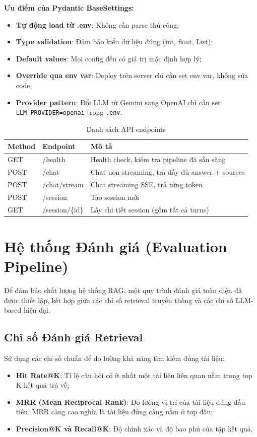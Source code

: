 \documentclass[../DoAn.tex]{subfiles}
\begin{document}
\textbf{Ưu điểm của Pydantic BaseSettings:}
\begin{itemize}
    \item \textbf{Tự động load từ .env}: Không cần parse thủ công;
    \item \textbf{Type validation}: Đảm bảo kiểu dữ liệu đúng (int, float, List);
    \item \textbf{Default values}: Mọi config đều có giá trị mặc định hợp lý;
    \item \textbf{Override qua env var}: Deploy trên server chỉ cần set env var, không sửa code;
    \item \textbf{Provider pattern}: Đổi LLM từ Gemini sang OpenAI chỉ cần set \texttt{LLM\_PROVIDER=openai} trong \texttt{.env}.
\end{itemize}

\begin{table}[H]
\centering
\begin{tabular}{|l|l|p{7cm}|}
\hline
\textbf{Method} & \textbf{Endpoint} & \textbf{Mô tả} \\
\hline
GET & /health & Health check, kiểm tra pipeline đã sẵn sàng \\
\hline
POST & /chat & Chat non-streaming, trả đầy đủ answer + sources \\
\hline
POST & /chat/stream & Chat streaming SSE, trả từng token \\
\hline
POST & /session & Tạo session mới \\
\hline
GET & /session/\{id\} & Lấy chi tiết session (gồm tất cả turns) \\
\hline
\end{tabular}
\caption{Danh sách API endpoints}
\end{table}


\section{Hệ thống Đánh giá (Evaluation Pipeline)}

Để đảm bảo chất lượng hệ thống RAG, một quy trình đánh giá toàn diện đã được thiết lập, kết hợp giữa các chỉ số retrieval truyền thống và các chỉ số LLM-based hiện đại.

\subsection{Chỉ số Đánh giá Retrieval}
Sử dụng các chỉ số chuẩn để đo lường khả năng tìm kiếm đúng tài liệu:
\begin{itemize}
    \item \textbf{Hit Rate@K}: Tỉ lệ câu hỏi có ít nhất một tài liệu liên quan nằm trong top K kết quả trả về;
    \item \textbf{MRR (Mean Reciprocal Rank)}: Đo lường vị trí của tài liệu đúng đầu tiên. MRR càng cao nghĩa là tài liệu đúng càng nằm ở top đầu;
    \item \textbf{Precision@K và Recall@K}: Độ chính xác và độ bao phủ của tập kết quả.
\end{itemize}
\end{document}
